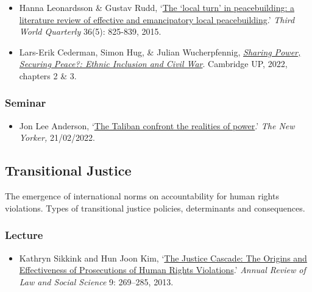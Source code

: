 \documentclass[12pt, a4paper]{article}
\begin{document}
\begin{itemize}
\setlength\itemsep{0pt}
\item Hanna Leonardsson \& Gustav Rudd, `\href{https://doi.org/10.1080/01436597.2015.1029905}{The ‘local turn’ in peacebuilding: a literature review of effective and emancipatory local peacebuilding}.' \textit{Third World Quarterly} 36(5): 825-839, 2015.
\item Lars-Erik Cederman, Simon Hug, \& Julian Wucherpfennig, \href{https://doi.org/10.1017/9781108284639}{\textit{Sharing Power, Securing Peace?: Ethnic Inclusion and Civil War}}. Cambridge UP, 2022, chapters 2 \& 3.
\end{itemize}

\subsubsection*{Seminar}

\begin{itemize}
\setlength\itemsep{0pt}
\item Jon Lee Anderson, `\href{https://www.newyorker.com/magazine/2022/02/28/the-taliban-confront-the-realities-of-power-afghanistan}{The Taliban confront the realities of power}.' \textit{The New Yorker,} 21/02/2022.
\end{itemize}


\hline %

\subsection{Transitional Justice}\label{tj}

The emergence of international norms on accountability for human rights violations. Types of transitional justice policies, determinants and consequences.

\subsubsection*{Lecture}

\begin{itemize}
\setlength\itemsep{0pt}
\item Kathryn Sikkink and Hun Joon Kim, `\href{https://doi.org/10.1146/annurev-lawsocsci-102612-133956}{The Justice Cascade: The Origins and Effectiveness of Prosecutions of Human Rights Violations}.' \textit{Annual Review of Law and Social Science} 9: 269--285, 2013.
\end{itemize}
\end{document}
